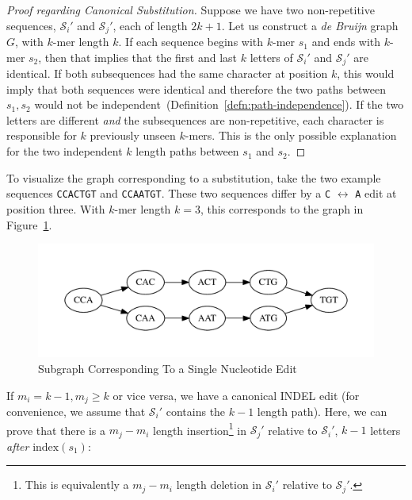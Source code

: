 \documentclass[masters]{ucbthesis}
\begin{document}
\begin{proof}[Proof regarding Canonical Substitution]
\label{proof:canonical-substitution}
Suppose we have two non-repetitive sequences, $\mathcal{S}_i'$ and $\mathcal{S}_j'$, each of length
$2k + 1$. Let us construct a \emph{de Bruijn} graph $G$, with $k$-mer length $k$. If each sequence begins with
$k$-mer $s_1$ and ends with $k$-mer $s_2$, then that implies that the first and last $k$ letters of
$\mathcal{S}_i'$ and $\mathcal{S}_j'$ are identical. If both subsequences had the same character at
position $k$, this would imply that both sequences were identical and therefore the two paths between
$s_1, s_2$ would not be independent~(Definition~\ref{defn:path-independence}). If the two letters are
different \emph{and} the subsequences are non-repetitive, each character is responsible for $k$
previously unseen $k$-mers. This is the only possible explanation for the two independent $k$ length
paths between $s_1$ and $s_2$.
\end{proof}

To visualize the graph corresponding to a substitution, take the two example sequences \texttt{CCACTGT}
and \texttt{CCAATGT}. These two sequences differ by a \texttt{C} $\leftrightarrow$ \texttt{A} edit at
position three. With $k$-mer length $k = 3$, this corresponds to the graph in Figure~\ref{fig:sne}.

\begin{figure}[h]
\begin{center}
\includegraphics[width=0.5\linewidth, clip=true, trim=0 39 0 39]{graphs/sne.pdf}
\end{center}
\caption{Subgraph Corresponding To a Single Nucleotide Edit}
\label{fig:sne}
\end{figure}

If $m_i = k - 1, m_j \ge k$ or vice versa, we have a canonical INDEL edit (for convenience, we assume
that $\mathcal{S}_i'$ contains the $k - 1$ length path). Here, we can prove that there is a $m_j - m_i$
length insertion\footnote{This is equivalently a $m_j - m_i$ length deletion in $\mathcal{S}_i'$ relative to
$\mathcal{S}_j'$.} in $\mathcal{S}_j'$ relative to $\mathcal{S}_i'$, $k - 1$ letters \emph{after}
$\text{index}(s_1)$:
\end{document}
